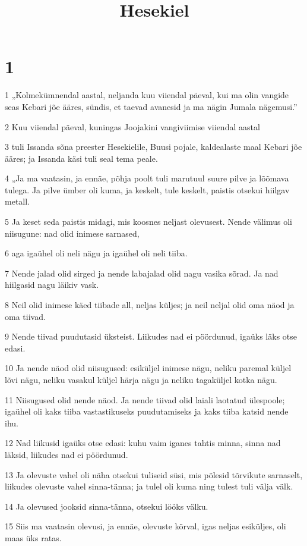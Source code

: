 

\title{Hesekiel}

\chapter{1}

\par 1 „Kolmekümnendal aastal, neljanda kuu viiendal päeval, kui ma olin vangide seas Kebari jõe ääres, sündis, et taevad avanesid ja ma nägin Jumala nägemusi.”
\par 2 Kuu viiendal päeval, kuningas Joojakini vangiviimise viiendal aastal
\par 3 tuli Issanda sõna preester Hesekielile, Buusi pojale, kaldealaste maal Kebari jõe ääres; ja Issanda käsi tuli seal tema peale.
\par 4 „Ja ma vaatasin, ja ennäe, põhja poolt tuli marutuul suure pilve ja lõõmava tulega. Ja pilve ümber oli kuma, ja keskelt, tule keskelt, paistis otsekui hiilgav metall.
\par 5 Ja keset seda paistis midagi, mis koosnes neljast olevusest. Nende välimus oli niisugune: nad olid inimese sarnased,
\par 6 aga igaühel oli neli nägu ja igaühel oli neli tiiba.
\par 7 Nende jalad olid sirged ja nende labajalad olid nagu vasika sõrad. Ja nad hiilgasid nagu läikiv vask.
\par 8 Neil olid inimese käed tiibade all, neljas küljes; ja neil neljal olid oma näod ja oma tiivad.
\par 9 Nende tiivad puudutasid üksteist. Liikudes nad ei pöördunud, igaüks läks otse edasi.
\par 10 Ja nende näod olid niisugused: esiküljel inimese nägu, neliku paremal küljel lõvi nägu, neliku vasakul küljel härja nägu ja neliku tagaküljel kotka nägu.
\par 11 Niisugused olid nende näod. Ja nende tiivad olid laiali laotatud ülespoole; igaühel oli kaks tiiba vastastikuseks puudutamiseks ja kaks tiiba katsid nende ihu.
\par 12 Nad liikusid igaüks otse edasi: kuhu vaim iganes tahtis minna, sinna nad läksid, liikudes nad ei pöördunud.
\par 13 Ja olevuste vahel oli näha otsekui tuliseid süsi, mis põlesid tõrvikute sarnaselt, liikudes olevuste vahel sinna-tänna; ja tulel oli kuma ning tulest tuli välja välk.
\par 14 Ja olevused jooksid sinna-tänna, otsekui lööks välku.
\par 15 Siis ma vaatasin olevusi, ja ennäe, olevuste kõrval, igas neljas esiküljes, oli maas üks ratas.
